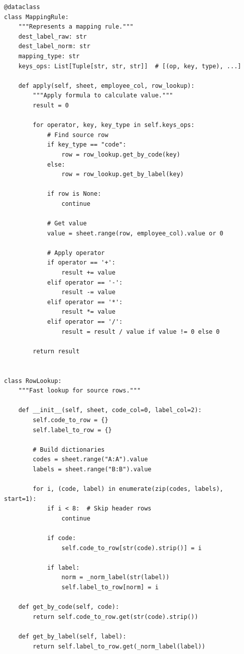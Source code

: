 \begin{lstlisting}[style=pythonstyle]
@dataclass
class MappingRule:
    """Represents a mapping rule."""
    dest_label_raw: str
    dest_label_norm: str
    mapping_type: str
    keys_ops: List[Tuple[str, str, str]]  # [(op, key, type), ...]
    
    def apply(self, sheet, employee_col, row_lookup):
        """Apply formula to calculate value."""
        result = 0
        
        for operator, key, key_type in self.keys_ops:
            # Find source row
            if key_type == "code":
                row = row_lookup.get_by_code(key)
            else:
                row = row_lookup.get_by_label(key)
            
            if row is None:
                continue
            
            # Get value
            value = sheet.range(row, employee_col).value or 0
            
            # Apply operator
            if operator == '+':
                result += value
            elif operator == '-':
                result -= value
            elif operator == '*':
                result *= value
            elif operator == '/':
                result = result / value if value != 0 else 0
        
        return result


class RowLookup:
    """Fast lookup for source rows."""
    
    def __init__(self, sheet, code_col=0, label_col=2):
        self.code_to_row = {}
        self.label_to_row = {}
        
        # Build dictionaries
        codes = sheet.range("A:A").value
        labels = sheet.range("B:B").value
        
        for i, (code, label) in enumerate(zip(codes, labels), start=1):
            if i < 8:  # Skip header rows
                continue
            
            if code:
                self.code_to_row[str(code).strip()] = i
            
            if label:
                norm = _norm_label(str(label))
                self.label_to_row[norm] = i
    
    def get_by_code(self, code):
        return self.code_to_row.get(str(code).strip())
    
    def get_by_label(self, label):
        return self.label_to_row.get(_norm_label(label))



\end{lstlisting}
